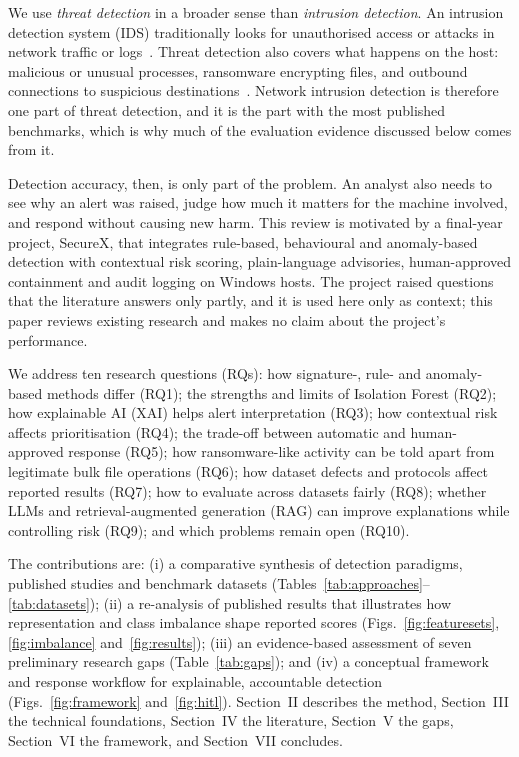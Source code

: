 \documentclass[conference]{IEEEtran}
\begin{document}
We use \emph{threat detection} in a broader sense than \emph{intrusion detection}. An intrusion detection system (IDS) traditionally looks for unauthorised access or attacks in network traffic or logs~\cite{buczak2016survey}. Threat detection also covers what happens on the host: malicious or unusual processes, ransomware encrypting files, and outbound connections to suspicious destinations~\cite{oz2022survey}. Network intrusion detection is therefore one part of threat detection, and it is the part with the most published benchmarks, which is why much of the evaluation evidence discussed below comes from it.

Detection accuracy, then, is only part of the problem. An analyst also needs to see why an alert was raised, judge how much it matters for the machine involved, and respond without causing new harm. This review is motivated by a final-year project, SecureX, that integrates rule-based, behavioural and anomaly-based detection with contextual risk scoring, plain-language advisories, human-approved containment and audit logging on Windows hosts. The project raised questions that the literature answers only partly, and it is used here only as context; this paper reviews existing research and makes no claim about the project's performance.

We address ten research questions (RQs): how signature-, rule- and anomaly-based methods differ (RQ1); the strengths and limits of Isolation Forest (RQ2); how explainable AI (XAI) helps alert interpretation (RQ3); how contextual risk affects prioritisation (RQ4); the trade-off between automatic and human-approved response (RQ5); how ransomware-like activity can be told apart from legitimate bulk file operations (RQ6); how dataset defects and protocols affect reported results (RQ7); how to evaluate across datasets fairly (RQ8); whether LLMs and retrieval-augmented generation (RAG) can improve explanations while controlling risk (RQ9); and which problems remain open (RQ10).

The contributions are: (i) a comparative synthesis of detection paradigms, published studies and benchmark datasets (Tables~\ref{tab:approaches}--\ref{tab:datasets}); (ii) a re-analysis of published results that illustrates how representation and class imbalance shape reported scores (Figs.~\ref{fig:featuresets}, \ref{fig:imbalance} and~\ref{fig:results}); (iii) an evidence-based assessment of seven preliminary research gaps (Table~\ref{tab:gaps}); and (iv) a conceptual framework and response workflow for explainable, accountable detection (Figs.~\ref{fig:framework} and~\ref{fig:hitl}). Section~II describes the method, Section~III the technical foundations, Section~IV the literature, Section~V the gaps, Section~VI the framework, and Section~VII concludes.
\end{document}
